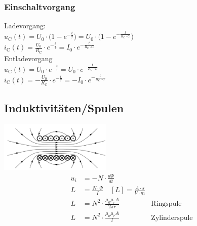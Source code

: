 \subsubsection{Einschaltvorgang}
\begin{multicols}{2}		
	Ladevorgang:\\
	$u_{\mathrm{C}} (t) = U_0 \cdot \biggl(1 - e^{- \frac{t}{\tau}}\biggr) = U_0
	\cdot \biggl(1 - e^{- \frac{t}{R_{\mathrm{C}} \cdot C}}\biggr)$\\
	$i_{\mathrm{C}} (t) = \frac{U_0}{R_{\mathrm{C}}} \cdot e^{- \frac{t}{\tau}} =
	I_0 \cdot e^{- \frac{t}{R_{\mathrm{C}} \cdot C}}$\\
	\newline
	Entladevorgang\\
	$u_{\mathrm{C}} (t) = U_0 \cdot e^{- \frac{t}{\tau}} = U_0 \cdot e^{-
	\frac{t}{R_{\mathrm{C}} \cdot C}}$\\
	$i_{\mathrm{C}} (t) = -	\frac{U_0}{R_{\mathrm{C}}} \cdot e^{- \frac{t}{\tau}}
	= - I_0 \cdot e^{-\frac{t}{R_{\mathrm{C}} \cdot C}}$\\
\end{multicols}

\subsection{Induktivitäten/Spulen}
\begin{multicols}{2}
	\includegraphics[width=0.4\textwidth]{pictures/induktivitaet}
	\columnbreak
	\begin{align*}
  		u_{i} &=-N\cdot\frac{d\Phi}{dt}\\
  		L &=\frac{N\cdot\Phi}{I} \quad [L] = \frac{A \cdot s}{V \cdot m} \\
  		L &=N^2\cdot\frac{\mu_{0}\mu_{r}A}{2\pi r} & \text{Ringspule} \\
  		L &=N^2\cdot\frac{\mu_{0}\mu_{r}A}{l} & \text{Zylinderspule}
	\end{align*}
\end{multicols}

